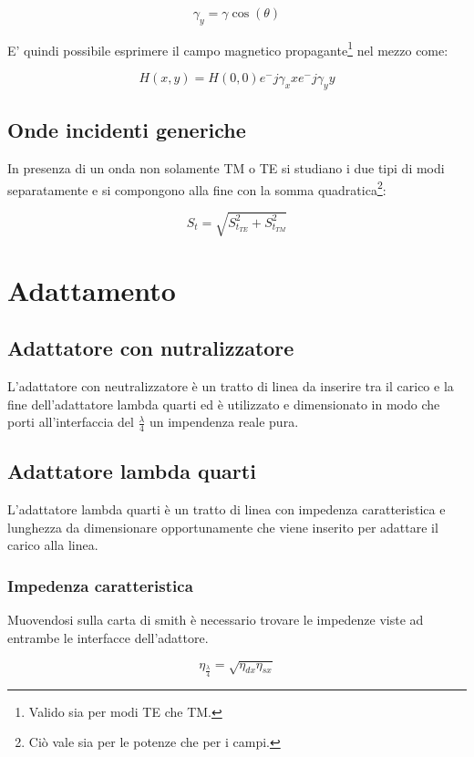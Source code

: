 \documentclass[10pt,a4paper]{report}
\begin{document}
			\[
			\gamma_y=\gamma\cos(\theta)
			\]

			E' quindi possibile esprimere il campo magnetico propagante\footnote{Valido sia per modi TE che TM.} nel mezzo come:
			
			\[
			H(x,y)=H(0,0)e^-{j\gamma_x x}e^-{j\gamma_y y}
			\]
		

		\section{Onde incidenti generiche}

		In presenza di un onda non solamente TM o TE si studiano i due tipi di modi separatamente e si compongono alla fine con la somma quadratica\footnote{Ciò vale sia per le potenze che per i campi.}:

		\[
		S_{t}=\sqrt{S_{t_{TE}}^2 +S_{t_{TM}}^2 }
		\]

\chapter{Adattamento}

	\section{Adattatore con nutralizzatore}

		L'adattatore con neutralizzatore è un tratto di linea da inserire tra il carico e la fine dell'adattatore lambda quarti ed è utilizzato e dimensionato in modo che porti all'interfaccia del $\frac{\lambda}{4}$ un impendenza reale pura.

	\section{Adattatore lambda quarti}
		
		L'adattatore lambda quarti è un tratto di linea con impedenza caratteristica e lunghezza da dimensionare opportunamente che viene inserito per adattare il carico alla linea.

		\subsection{Impedenza caratteristica}
				Muovendosi sulla carta di smith è necessario trovare le impedenze viste ad entrambe le interfacce dell'adattore.

				\begin{equation}
				\eta_{\frac{\lambda}{4}}=\sqrt{\eta_{dx}\eta_{sx}}
				\end{equation}
\end{document}
